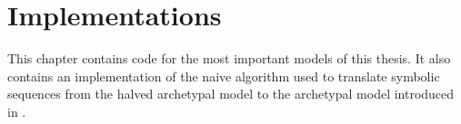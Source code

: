 \chapter{Implementations}
\label{chap:app.implementations}

\lstset{
	numbers=left,
	stepnumber=1,
	numberstyle=\tiny,
	numbersep=2em,
	numberblanklines=false,
}

This chapter contains code for the most important models of this thesis.
It also contains an implementation of the naive algorithm used to translate symbolic sequences from the halved archetypal model to the archetypal model introduced in .




